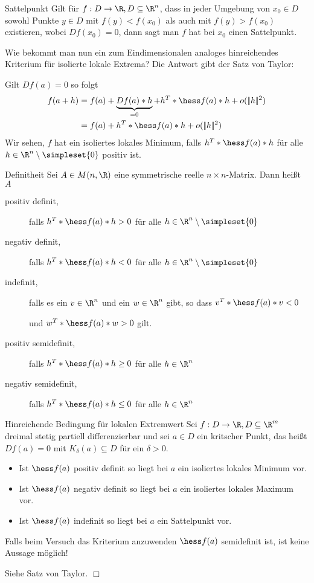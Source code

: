 \begin{definition}{Sattelpunkt}
	Gilt für $f:D\rightarrow \R,D\subseteq \R^n$, dass in jeder Umgebung von $x_0\in D$ sowohl Punkte $y\in D$ mit $f(y)<f(x_0)$ als auch mit $f(y)>f(x_0)$ existieren, wobei $Df(x_0)=0$, dann sagt man $f$ hat bei $x_0$ einen Sattelpunkt.
\end{definition}

Wie bekommt man nun ein zum Eindimensionalen analoges hinreichendes Kriterium für isolierte lokale Extrema? Die Antwort gibt der Satz von Taylor:

Gilt $Df(a)=0$ so folgt
\begin{align*}
	f(a+h)&=f(a)+\underbrace{Df(a)*h}_{=0}+h^T*\hess f(a)*h+o(|\!|h|\!|^2)\\
	&=f(a)+h^T*\hess f(a)*h+o(|\!|h|\!|^2)
\end{align*}
Wir sehen, $f$ hat ein isoliertes lokales Minimum, falls $h^T*\hess f(a)*h$ für alle $h\in\R^n\setminus\simpleset{0}$ positiv ist.

\begin{definition}{Definitheit}
	Sei $A\in M(n,\R)$ eine symmetrische reelle $n\times n$-Matrix. Dann heißt $A$
	\begin{description}
		\item [positiv definit,] falls $h^T*\hess f(a)*h>0$ für alle $h\in\R^n\setminus\simpleset{0}$
		\item [negativ definit,] falls $h^T*\hess f(a)*h<0$ für alle $h\in\R^n\setminus\simpleset{0}$
		\item [indefinit,] falls es ein $v\in\R^n$ und ein $w\in\R^n$ gibt, so dass $v^T*\hess f(a)*v<0$

		und $w^T*\hess f(a)*w>0$ gilt.

		\item [positiv semidefinit,] falls $h^T*\hess f(a)*h\geq0$ für alle $h\in\R^n$
		\item [negativ semidefinit,] falls $h^T*\hess f(a)*h\leq0$ für alle $h\in\R^n$
	\end{description}
\end{definition}

\begin{satz}{Hinreichende Bedingung für lokalen Extremwert}
	Sei $f:D\rightarrow \R,D\subseteq\R^m$ dreimal stetig partiell differenzierbar und sei $a\in D$ ein kritscher Punkt, das heißt $Df(a)=0$ mit $K_\delta (a)\subseteq D$ für ein $\delta>0$.
	\begin{itemize}
		\item Ist $\hess f(a)$ positiv definit so liegt bei $a$ ein isoliertes lokales Minimum vor.
		\item Ist $\hess f(a)$ negativ definit so liegt bei $a$ ein isoliertes lokales Maximum vor.
		\item Ist $\hess f(a)$ indefinit so liegt bei $a$ ein Sattelpunkt vor.
	\end{itemize}
	Falls beim Versuch das Kriterium anzuwenden $\hess f(a)$ semidefinit ist, ist keine Aussage möglich!
\end{satz}
\begin{beweis}
	Siehe Satz von Taylor. \hfill $\Box$
\end{beweis}

